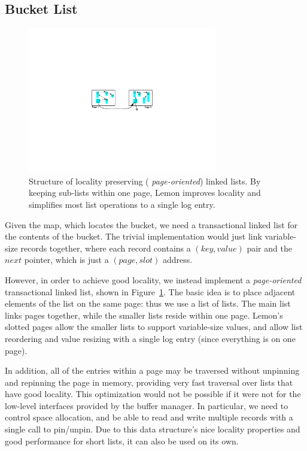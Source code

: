 \documentclass[10pt,letterpaper,twocolumn,english]{article}
\newcommand{\yad}{Lemon\xspace}
\begin{document}
\subsection{Bucket List}

\begin{figure}
\hspace{.25in}
\includegraphics[width=3.25in]{LHT2.pdf}
\vspace{-24pt}
\caption{\sf\label{fig:LHT}Structure of locality preserving ({\em
page-oriented}) linked lists. By keeping sub-lists within one page,
\yad improves locality and simplifies most list operations to a single
log entry.}
\end{figure}

Given the map, which locates the bucket, we need a transactional
linked list for the contents of the bucket.  The trivial implementation
would just link variable-size records together, where each record
contains a $(key,value)$ pair and the $next$ pointer, which is just a
$(page,slot)$ address.

However, in order to achieve good locality, we instead implement a
{\em page-oriented} transactional linked list, shown in
Figure~\ref{fig:LHT}.  The basic idea is to place adjacent elements of
the list on the same page: thus we use a list of lists. The main list
links pages together, while the smaller lists reside within one
page. \yad's slotted pages allow the smaller lists to support
variable-size values, and allow list reordering and value resizing
with a single log entry (since everything is on one page).

In addition, all of the entries within a page may be traversed without
unpinning and repinning the page in memory, providing very fast
traversal over lists that have good locality.  This optimization would
not be possible if it were not for the low-level interfaces provided
by the buffer manager.  In particular, we need to control space
allocation, and be able to read and write multiple records with a
single call to pin/unpin.  Due to this data structure's nice locality
properties and good performance for short lists, it can also be used
on its own.
\end{document}
